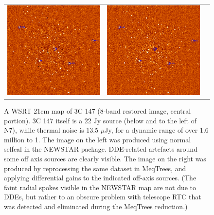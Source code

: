 \documentclass{aps2010} \special{papersize=8.5in,11in}
\begin{document}
\newpage

\begin{figure}
\begin{tabular}{@{}ccc@{}}
\includegraphics[width=8cm,clip=true,trim=0cm 4cm 0cm 2cm]{figures-meqtrees/3c147-newstar} &
\includegraphics[width=8cm,clip=true,trim=0cm 4cm 0cm 2cm]{figures-meqtrees/3c147-meqtrees} 
\end{tabular}
\caption{\label{fig:3c147}A WSRT 21cm map of 3C 147 (8-band restored image, central portion). 3C 147 itself is a 22 Jy source (below and to the left of N7), while thermal noise is 13.5 $\mu$Jy, for a dynamic range of over 1.6 million to 1. The image on the left was produced using normal selfcal in the NEWSTAR package. DDE-related artefacts around some off axis sources are clearly visible. The image on the right was produced by reprocessing the same dataset in MeqTrees, and applying differential gains to the indicated off-axis sources. (The faint radial spokes visible in the NEWSTAR map are not due to DDEs, but rather to an obscure problem with telescope RTC that was detected and eliminated during the MeqTrees reduction.)}
\end{figure}
\end{document}
